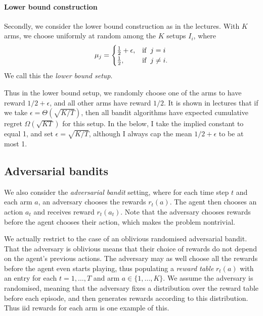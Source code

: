 \documentclass[10pt]{article}
\begin{document}
\paragraph{Lower bound construction}
Secondly, we consider the lower bound construction as in the lectures. With $K$
arms, we choose uniformly at random among the $K$ setups $I_i$, where
\begin{align*}
    \mu_j =
    \begin{cases}
        \frac{1}{2} + \epsilon, & \textrm{if} \hspace{0.2cm} j = i \\
        \frac{1}{2}, & \textrm{if} \hspace{0.2cm} j \not= i.
    \end{cases}
\end{align*}
We call this the \emph{lower bound setup}.

Thus in the lower bound setup, we randomly choose one of the arms to have reward
$1/2 + \epsilon$, and all other arms have reward $1/2$. It is shown in lectures
that if we take $\epsilon = \Theta(\sqrt{K/T})$, then all bandit algorithms have
expected cumulative regret $\Omega(\sqrt{K T})$ for this setup. In the below, I
take the implied constant to equal 1, and set $\epsilon = \sqrt{K/T}$, although
I always cap the mean $1/2 + \epsilon$ to be at most 1.

\subsection{Adversarial bandits}

We also consider the \emph{adversarial bandit} setting, where for each time step
$t$ and each arm $a$, an adversary chooses the rewards $r_t(a)$. The agent then
chooses an action $a_t$ and receives reward $r_t(a_t)$. Note that the adversary
chooses rewards before the agent chooses their action, which makes the problem
nontrivial.

We actually restrict to the case of an oblivious randomised adversarial bandit.
That the adversary is oblivious means that their choice of rewards do not depend
on the agent's previous actions. The adversary may as well choose all the
rewards before the agent even starts playing, thus populating a \emph{reward
table} $r_t(a)$ with an entry for each $t = 1, \ldots, T$ and arm $a \in \{1,
\ldots, K\}$. We assume the adversary is randomised, meaning that the adversary
fixes a distribution over the reward table before each episode, and then
generates rewards according to this distribution. Thus iid rewards for each arm is
one example of this.
\end{document}
